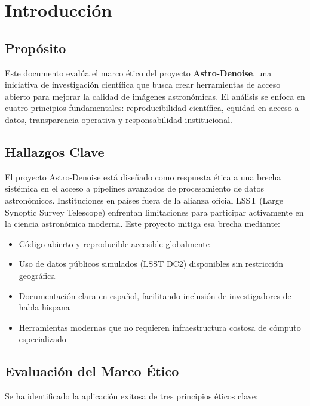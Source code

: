 \section{Introducción}

\subsection*{Propósito}

Este documento evalúa el marco ético del proyecto \textbf{Astro-Denoise}, una iniciativa de investigación científica que busca crear herramientas de acceso abierto para mejorar la calidad de imágenes astronómicas. El análisis se enfoca en cuatro principios fundamentales: reproducibilidad científica, equidad en acceso a datos, transparencia operativa y responsabilidad institucional.

\subsection*{Hallazgos Clave}

El proyecto Astro-Denoise está diseñado como respuesta ética a una brecha sistémica en el acceso a pipelines avanzados de procesamiento de datos astronómicos. Instituciones en países fuera de la alianza oficial LSST (Large Synoptic Survey Telescope) enfrentan limitaciones para participar activamente en la ciencia astronómica moderna. Este proyecto mitiga esa brecha mediante:

\begin{itemize}
    \item Código abierto y reproducible accesible globalmente
    \item Uso de datos públicos simulados (LSST DC2) disponibles sin restricción geográfica
    \item Documentación clara en español, facilitando inclusión de investigadores de habla hispana
    \item Herramientas modernas que no requieren infraestructura costosa de cómputo especializado
\end{itemize}

\subsection*{Evaluación del Marco Ético}

Se ha identificado la aplicación exitosa de tres principios éticos clave:

